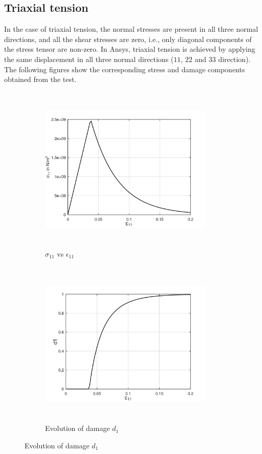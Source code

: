 \documentclass[a4paper,12pt,twoside]{report}
\begin{document}
\subsection{Triaxial tension}
\indent\indent\indent In the case of triaxial tension, the normal stresses are present in all three normal directions, and all the shear stresses are zero, i.e., only diagonal components of the stress tensor are non-zero.  In Ansys, triaxial tension is achieved by applying the same displacement in all three normal directions ($11$, $22$ and $33$ direction). The following figures show the corresponding stress and damage components obtained from the test.\\

\begin{figure}[htbp!]
       \captionsetup[subfigure]{justification=centering}
     \begin{subfigure}{0.4\textwidth}
         \includegraphics[width=8.3cm,height=8cm,keepaspectratio]{24.S11vsE11.png}
         \caption{$\sigma_{11}$ vs $\epsilon_{11}$}
         \label{fig:S11vsE11 2}
     \end{subfigure}
     \hspace{1.8cm}
     \captionsetup[subfigure]{justification=centering}
     \begin{subfigure}{0.4\textwidth}
         \includegraphics[width=8.3cm,height=8cm,keepaspectratio]{24.d1.png}
         \caption{Evolution of damage $d_{1}$}
         \label{fig:Evolution of damage d1 2}
     \end{subfigure}
\end{figure}
\end{document}
